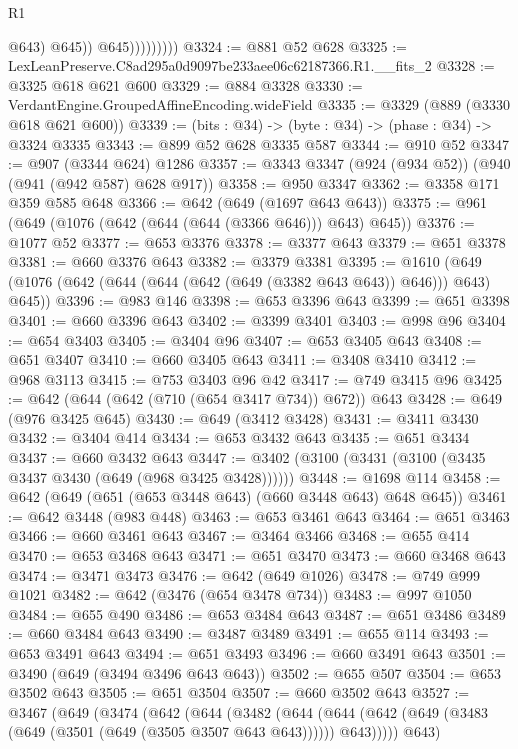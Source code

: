 \begin{lexlean}{R1}
\begin{coremodule}
                            @643)
                          @645))
                      @645)))))))))
@3324 := @881 @52 @628
@3325 := LexLeanPreserve.C8ad295a0d9097be233aee06c62187366.R1.__fits_2
@3328 := @3325 @618 @621 @600
@3329 := @884 @3328
@3330 := VerdantEngine.GroupedAffineEncoding.wideField
@3335 := @3329 (@889 (@3330 @618 @621 @600))
@3339 := (bits : @34) -> (byte : @34) -> (phase : @34) -> @3324 @3335
@3343 := @899 @52 @628 @3335 @587
@3344 := @910 @52
@3347 := @907 (@3344 @624) @1286
@3357 := @3343 @3347 (@924 (@934 @52)) (@940 (@941 (@942 @587) @628 @917))
@3358 := @950 @3347
@3362 := @3358 @171 @359 @585 @648
@3366 := @642 (@649 (@1697 @643 @643))
@3375 := @961 (@649 (@1076 (@642 (@644 (@644 (@3366 @646))) @643) @645))
@3376 := @1077 @52
@3377 := @653 @3376
@3378 := @3377 @643
@3379 := @651 @3378
@3381 := @660 @3376 @643
@3382 := @3379 @3381
@3395 := @1610 (@649 (@1076 (@642 (@644 (@644 (@642 (@649 (@3382 @643 @643)) @646))) @643) @645))
@3396 := @983 @146
@3398 := @653 @3396 @643
@3399 := @651 @3398
@3401 := @660 @3396 @643
@3402 := @3399 @3401
@3403 := @998 @96
@3404 := @654 @3403
@3405 := @3404 @96
@3407 := @653 @3405 @643
@3408 := @651 @3407
@3410 := @660 @3405 @643
@3411 := @3408 @3410
@3412 := @968 @3113
@3415 := @753 @3403 @96 @42
@3417 := @749 @3415 @96
@3425 := @642 (@644 (@642 (@710 (@654 @3417 @734)) @672)) @643
@3428 := @649 (@976 @3425 @645)
@3430 := @649 (@3412 @3428)
@3431 := @3411 @3430
@3432 := @3404 @414
@3434 := @653 @3432 @643
@3435 := @651 @3434
@3437 := @660 @3432 @643
@3447 := @3402 (@3100 (@3431 (@3100 (@3435 @3437 @3430 (@649 (@968 @3425 @3428))))))
@3448 := @1698 @114
@3458 := @642 (@649 (@651 (@653 @3448 @643) (@660 @3448 @643) @648 @645))
@3461 := @642 @3448 (@983 @448)
@3463 := @653 @3461 @643
@3464 := @651 @3463
@3466 := @660 @3461 @643
@3467 := @3464 @3466
@3468 := @655 @414
@3470 := @653 @3468 @643
@3471 := @651 @3470
@3473 := @660 @3468 @643
@3474 := @3471 @3473
@3476 := @642 (@649 @1026)
@3478 := @749 @999 @1021
@3482 := @642 (@3476 (@654 @3478 @734))
@3483 := @997 @1050
@3484 := @655 @490
@3486 := @653 @3484 @643
@3487 := @651 @3486
@3489 := @660 @3484 @643
@3490 := @3487 @3489
@3491 := @655 @114
@3493 := @653 @3491 @643
@3494 := @651 @3493
@3496 := @660 @3491 @643
@3501 := @3490 (@649 (@3494 @3496 @643 @643))
@3502 := @655 @507
@3504 := @653 @3502 @643
@3505 := @651 @3504
@3507 := @660 @3502 @643
@3527 := @3467
    (@649
      (@3474
        (@642
          (@644
            (@3482
              (@644
                (@644 (@642 (@649 (@3483 (@649 (@3501 (@649 (@3505 @3507 @643 @643)))))) @643)))))
          @643)

\end{coremodule}
\end{lexlean}
